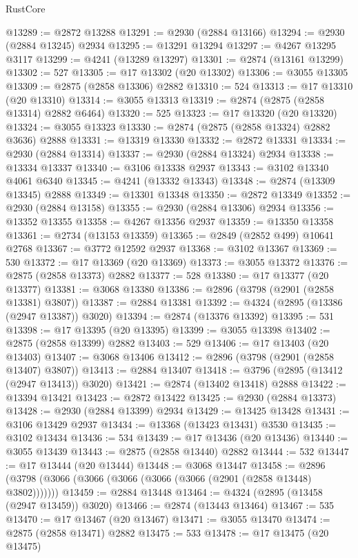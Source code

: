 \begin{lexlean}{RustCore}
\begin{coremodule}
@13289 := @2872 @13288
@13291 := @2930 (@2884 @13166)
@13294 := @2930 (@2884 @13245) @2934
@13295 := @13291 @13294
@13297 := @4267 @13295 @3117
@13299 := @4241 (@13289 @13297)
@13301 := @2874 (@13161 @13299)
@13302 := 527
@13305 := @17 @13302 (@20 @13302)
@13306 := @3055 @13305
@13309 := @2875 (@2858 @13306) @2882
@13310 := 524
@13313 := @17 @13310 (@20 @13310)
@13314 := @3055 @13313
@13319 := @2874 (@2875 (@2858 @13314) @2882 @6464)
@13320 := 525
@13323 := @17 @13320 (@20 @13320)
@13324 := @3055 @13323
@13330 := @2874 (@2875 (@2858 @13324) @2882 @3636) @2888
@13331 := @13319 @13330
@13332 := @2872 @13331
@13334 := @2930 (@2884 @13314)
@13337 := @2930 (@2884 @13324) @2934
@13338 := @13334 @13337
@13340 := @3106 @13338 @2937
@13343 := @3102 @13340 @4061 @6340
@13345 := @4241 (@13332 @13343)
@13348 := @2874 (@13309 @13345) @2888
@13349 := @13301 @13348
@13350 := @2872 @13349
@13352 := @2930 (@2884 @13158)
@13355 := @2930 (@2884 @13306) @2934
@13356 := @13352 @13355
@13358 := @4267 @13356 @2937
@13359 := @13350 @13358
@13361 := @2734 (@13153 @13359)
@13365 := @2849 (@2852 @499) @10641 @2768
@13367 := @3772 @12592 @2937
@13368 := @3102 @13367
@13369 := 530
@13372 := @17 @13369 (@20 @13369)
@13373 := @3055 @13372
@13376 := @2875 (@2858 @13373) @2882
@13377 := 528
@13380 := @17 @13377 (@20 @13377)
@13381 := @3068 @13380
@13386 := @2896 (@3798 (@2901 (@2858 @13381) @3807))
@13387 := @2884 @13381
@13392 := @4324 (@2895 (@13386 (@2947 @13387)) @3020)
@13394 := @2874 (@13376 @13392)
@13395 := 531
@13398 := @17 @13395 (@20 @13395)
@13399 := @3055 @13398
@13402 := @2875 (@2858 @13399) @2882
@13403 := 529
@13406 := @17 @13403 (@20 @13403)
@13407 := @3068 @13406
@13412 := @2896 (@3798 (@2901 (@2858 @13407) @3807))
@13413 := @2884 @13407
@13418 := @3796 (@2895 (@13412 (@2947 @13413)) @3020)
@13421 := @2874 (@13402 @13418) @2888
@13422 := @13394 @13421
@13423 := @2872 @13422
@13425 := @2930 (@2884 @13373)
@13428 := @2930 (@2884 @13399) @2934
@13429 := @13425 @13428
@13431 := @3106 @13429 @2937
@13434 := @13368 (@13423 @13431) @3530
@13435 := @3102 @13434
@13436 := 534
@13439 := @17 @13436 (@20 @13436)
@13440 := @3055 @13439
@13443 := @2875 (@2858 @13440) @2882
@13444 := 532
@13447 := @17 @13444 (@20 @13444)
@13448 := @3068 @13447
@13458 := @2896 (@3798 (@3066 (@3066 (@3066 (@3066 (@3066 (@2901 (@2858 @13448) @3802)))))))
@13459 := @2884 @13448
@13464 := @4324 (@2895 (@13458 (@2947 @13459)) @3020)
@13466 := @2874 (@13443 @13464)
@13467 := 535
@13470 := @17 @13467 (@20 @13467)
@13471 := @3055 @13470
@13474 := @2875 (@2858 @13471) @2882
@13475 := 533
@13478 := @17 @13475 (@20 @13475)

\end{coremodule}
\end{lexlean}

